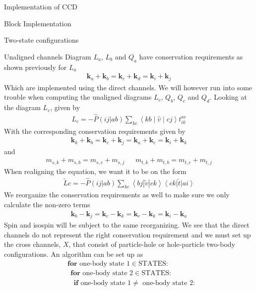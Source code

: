 \documentclass[twoside,english]{uiofysmaster}
\begin{document}
\begin{chapter}{Implementation of CCD}
\begin{section}{Block Implementation}
\begin{subsection}{Two-state configurations}
		\end{subsection}
		
		\begin{subsection}{Unaligned channels}
			Diagram $L_a$, $L_b$ and $Q_a$ have conservation requirements as shown previously for $L_a$
			\begin{align}
			 	\mathbf{k}_a + \mathbf{k}_b = \mathbf{k}_c + \mathbf{k}_d = \mathbf{k}_i + \mathbf{k}_j 
			\end{align}
			Which are implemented using the direct channels. We will however run into some trouble when computing the unaligned diagrams $L_c$, $Q_b$, $Q_c$ and $Q_d$. Looking at the diagram $L_c$, given by 
			\begin{align}
				L_c = - \hat P(ij|ab) \sum_{kc} \left<kb\middle|\hat v\middle| cj \right> t_{ik}^{ac}
			\end{align}
			With the corresponding conservation requirements given by
			\begin{align}
				\mathbf{k}_k + \mathbf{k}_b = \mathbf{k}_c + \mathbf{k}_j = \mathbf{k}_a + \mathbf{k}_c = \mathbf{k}_i + \mathbf{k}_k
			\end{align}
			and 
			\begin{align}
				m_{s,k} + m_{s,b} = m_{s,c} + m_{s,j}  \:\:\:\:\:\:\: m_{t,k} + m_{t,b} = m_{t,c} + m_{t,j} 
			\end{align}
			When realigning the equation, we want it to be on the form
			\begin{align}
				\tilde Lc = -\hat P(ij|ab) \sum_{kc} \left<bj | \tilde v | ck \right> \left< ck \right| \tilde t \left| ai \right>
			\end{align}
			We reorganize the conservation requirements as well to make sure we only calculate the non-zero terms
			\begin{align}
				\mathbf{k}_b - \mathbf{k}_j = \mathbf{k}_c - \mathbf{k}_k = \mathbf{k}_c - \mathbf{k}_k = \mathbf{k}_i - \mathbf{k}_a
			\end{align}
			Spin and isospin will be subject to the same reorganizing. We see that the direct channels do not represent the right conservation requirement and we must set up the cross channels, $X$, that consist of particle-hole or hole-particle two-body configurations. An algorithm can be set up as
			\begin{align*}
				&\mathbf{for } \text{ one-body state 1} \in \text{STATES}:\\
				&\:\: \mathbf{for } \text{ one-body state 2} \in \text{STATES}:\\
				&\:\:\:\: \mathbf{if} \text{ one-body state 1} \neq \text{ one-body state 2}:\\

\end{align*}
\end{subsection}
\end{section}
\end{chapter}
\end{document}
